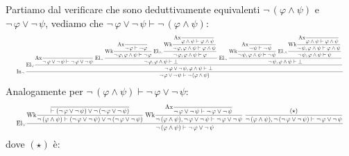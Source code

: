 \begin{example}
    Partiamo dal verificare che sono deduttivamente equivalenti $\neg \, (\varphi \land \psi)$ e $\neg \,\varphi \lor \neg \,\psi$, vediamo che $\neg \, \varphi \lor \neg \,\psi \vdash \neg \, (\varphi \land \psi)$:
    \[\resizebox{0.98\linewidth}{!}{$\displaystyle\text{In}_\neg \,\frac{\displaystyle\text{El}_\lor\frac{\displaystyle \text{Ax}\frac{}{\neg \,\varphi\lor\neg \,\psi\vdash\neg \,\varphi\lor\neg \,\psi} \; \text{El}_\neg \,\frac{\displaystyle \text{Wk}\frac{\displaystyle\text{Ax}\frac{}{\neg \,\varphi\vdash\neg \,\varphi}}{\neg \,\varphi,\varphi\land\psi\vdash\neg \,\varphi} \; \text{El}_{\land\cdot}\frac{\displaystyle\text{Wk}\frac{\displaystyle\text{Ax}\frac{}{\varphi\land\psi\vdash\varphi\land\psi}}{\neg \,\varphi,\varphi\land\psi\vdash\varphi\land\psi}}{\neg \,\varphi,\varphi\land\psi\vdash\varphi}}{\neg \,\varphi,\varphi\land\psi\vdash\bot} \; \text{El}_\neg \,\frac{\displaystyle \text{Wk}\frac{\displaystyle\text{Ax}\frac{}{\neg \,\psi\vdash\neg \,\psi}}{\neg \,\psi,\varphi\land\psi\vdash\neg \,\psi} \; \text{El}_{\cdot\land}\frac{\displaystyle\text{Wk}\frac{\displaystyle\text{Ax}\frac{}{\varphi\land\psi\vdash\varphi\land\psi}}{\neg \,\psi,\varphi\land\psi\vdash\varphi\land\psi}}{\neg \,\psi,\varphi\land\psi\vdash\psi}}{\neg \,\psi,\varphi\land\psi\vdash\bot}}{\neg \,\varphi\lor\neg \,\psi,\varphi\land\psi\vdash\bot}}{\neg \,\varphi\lor\neg \,\psi\vdash\neg \,(\varphi\land\psi)}$}\]
    Analogamente per $\neg \, (\varphi \land \psi) \vdash \neg \,\varphi \lor \neg \,\psi$:
    \[\resizebox{0.98\linewidth}{!}{$\displaystyle\text{El}_{\lor}\frac{\displaystyle \text{Wk}\frac{\displaystyle\frac{}{\vdash (\neg \,\varphi\lor\neg \,\psi)\lor\neg \,(\neg \,\varphi\lor\neg \,\psi)}}{\neg \,(\varphi\land\psi)\vdash(\neg \,\varphi\lor\neg \,\psi)\lor\neg \,(\neg \,\varphi\lor\neg \,\psi)} \; \text{Wk}\frac{\displaystyle\text{Ax}\frac{}{\neg \,\varphi\lor\neg \,\psi\vdash\neg \,\varphi\lor\neg \,\psi}}{\neg \,(\varphi\land\psi),\neg \,\varphi\lor\neg \,\psi\vdash\neg \,\varphi\lor\neg \,\psi} \; \frac{(\star)}{\neg \,(\varphi\land\psi),\neg \,(\neg \,\varphi\lor\neg \,\psi)\vdash\neg \,\varphi\lor\neg \,\psi}}{\neg \,(\varphi\land\psi)\vdash\neg \,\varphi\lor\neg \,\psi}$}\]
    dove $(\star)$ è:

\end{example}
